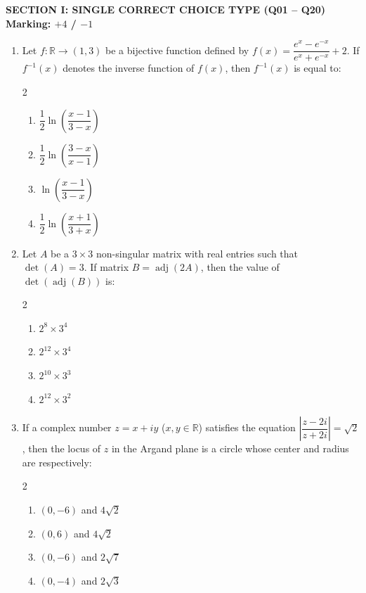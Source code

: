 \documentclass[11pt,a4paper]{article}
\begin{document}
\begin{tcolorbox}[sectionbanner]
  {\large \textbf{\textsf{SECTION I: SINGLE CORRECT CHOICE TYPE (Q01 -- Q20)}}} \hfill {\small \textbf{Marking: $+4$ / $-1$}}
\end{tcolorbox}
\vspace{4pt}
\begin{enumerate}[label=\textbf{\arabic*.},leftmargin=18pt,itemsep=12pt]

  \item Let $f: \mathbb{R} \to (1, 3)$ be a bijective function defined by $f(x) = \dfrac{e^x - e^{-x}}{e^x + e^{-x}} + 2$. If $f^{-1}(x)$ denotes the inverse function of $f(x)$, then $f^{-1}(x)$ is equal to:
  \begin{multicols}{2}
    \begin{enumerate}[label=(\Alph*)]
      \item $\dfrac{1}{2}\ln\left(\dfrac{x - 1}{3 - x}\right)$
      \item $\dfrac{1}{2}\ln\left(\dfrac{3 - x}{x - 1}\right)$
      \item $\ln\left(\dfrac{x - 1}{3 - x}\right)$
      \item $\dfrac{1}{2}\ln\left(\dfrac{x + 1}{3 + x}\right)$
    \end{enumerate}
  \end{multicols}

  \item Let $A$ be a $3 \times 3$ non-singular matrix with real entries such that $\det(A) = 3$. If matrix $B = \operatorname{adj}(2A)$, then the value of $\det(\operatorname{adj}(B))$ is:
  \begin{multicols}{2}
    \begin{enumerate}[label=(\Alph*)]
      \item $2^8 \times 3^4$
      \item $2^{12} \times 3^4$
      \item $2^{10} \times 3^3$
      \item $2^{12} \times 3^2$
    \end{enumerate}
  \end{multicols}

  \item If a complex number $z = x + iy$ ($x, y \in \mathbb{R}$) satisfies the equation $\left|\dfrac{z - 2i}{z + 2i}\right| = \sqrt{2}$, then the locus of $z$ in the Argand plane is a circle whose center and radius are respectively:
  \begin{multicols}{2}
    \begin{enumerate}[label=(\Alph*)]
      \item $(0, -6)$ and $4\sqrt{2}$
      \item $(0, 6)$ and $4\sqrt{2}$
      \item $(0, -6)$ and $2\sqrt{7}$
      \item $(0, -4)$ and $2\sqrt{3}$
    \end{enumerate}
  \end{multicols}


\end{enumerate}
\end{document}
